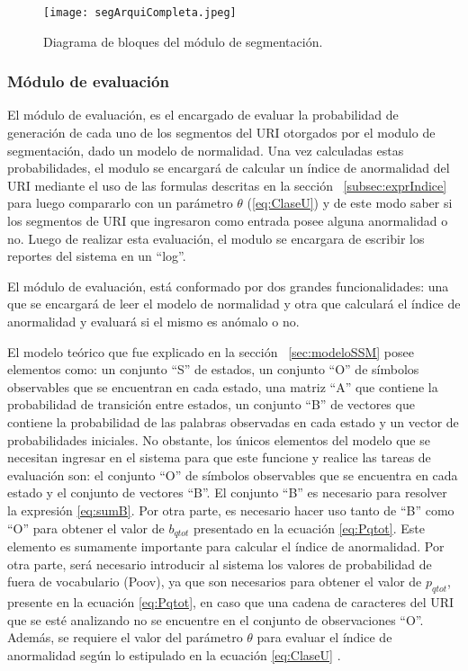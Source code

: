 \begin{figure}[tb]
\begin{center}
\texttt{[image: segArquiCompleta.jpeg]}
\caption{Diagrama de bloques del módulo de segmentación.}
\label{fig:arquiSegmentacion}
\end{center}
\end{figure}

\subsubsection{Módulo de evaluación}
\label{sec:evaluacion}

El módulo de evaluación, es el encargado de evaluar la probabilidad de generación de cada uno de los segmentos del URI otorgados por el modulo de segmentación, dado un modelo de normalidad. Una vez calculadas estas probabilidades, el modulo se encargará de calcular un índice de anormalidad del URI mediante el uso de las formulas descritas en la sección ~\ref{subsec:exprIndice} para luego compararlo con un parámetro $\theta$ (\ref{eq:ClaseU}) y de este modo saber si los segmentos de URI que ingresaron como entrada posee alguna anormalidad o no. Luego de realizar esta evaluación, el modulo se encargara de escribir los reportes del sistema en un ``log''.

El módulo de evaluación, está conformado por dos grandes funcionalidades: una que se encargará de leer el modelo de normalidad y  otra que calculará el índice de anormalidad y evaluará si el mismo es anómalo o no. 

El modelo teórico que fue explicado en la sección ~\ref{sec:modeloSSM} posee elementos como: un conjunto ``S'' de estados, un conjunto ``O'' de símbolos observables que se encuentran en cada estado, una matriz ``A'' que contiene la probabilidad de transición entre estados, un conjunto ``B'' de vectores que contiene la probabilidad de las palabras observadas en cada estado y un vector de probabilidades iniciales. No obstante, los únicos elementos del modelo que se necesitan ingresar en el sistema para que este funcione y realice las tareas de evaluación son: el conjunto ``O'' de símbolos observables que se encuentra en cada estado y el conjunto de vectores ``B''. El conjunto ``B'' es necesario para resolver la expresión \ref{eq:sumB}. Por otra parte, es necesario hacer uso tanto de ``B'' como ``O'' para obtener el valor de $b_{qtot}$ presentado en la ecuación \ref{eq:Pqtot}. Este elemento es sumamente importante para calcular el índice de anormalidad. Por otra parte, será necesario introducir al sistema los valores de probabilidad de fuera de vocabulario (Poov), ya que son necesarios para obtener el valor de $p_{qtot}$, presente en la ecuación \ref{eq:Pqtot}, en caso que una cadena de caracteres del URI que se esté analizando no se encuentre en el conjunto de observaciones ``O''. Además, se requiere el valor del parámetro $\theta$ para evaluar el índice de anormalidad según lo estipulado en la ecuación \ref{eq:ClaseU} .

